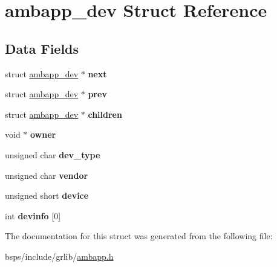 \hypertarget{structambapp__dev}{}\section{ambapp\+\_\+dev Struct Reference}
\label{structambapp__dev}
\subsection*{Data Fields}
\begin{DoxyCompactItemize}
\item 
\mbox{\label{structambapp__dev_a381cf3c88e29b41fd8f0ba7e7933e412}} 
struct \mbox{\hyperlink{structambapp__dev}{ambapp\+\_\+dev}} $\ast$ {\bfseries next}
\item 
\mbox{\label{structambapp__dev_ad15e4b61830b7d77a242a30af5947dfe}} 
struct \mbox{\hyperlink{structambapp__dev}{ambapp\+\_\+dev}} $\ast$ {\bfseries prev}
\item 
\mbox{\label{structambapp__dev_a83a52ee4fbba518aa3d7bceca3c3b446}} 
struct \mbox{\hyperlink{structambapp__dev}{ambapp\+\_\+dev}} $\ast$ {\bfseries children}
\item 
\mbox{\label{structambapp__dev_acbc2c0b8d1330c83c6d73915c0e8e324}} 
void $\ast$ {\bfseries owner}
\item 
\mbox{\label{structambapp__dev_a15cbf98f9241021b1725a211c4a76bb9}} 
unsigned char {\bfseries dev\+\_\+type}
\item 
\mbox{\label{structambapp__dev_a3f8de636546e46e42c02be360eadc427}} 
unsigned char {\bfseries vendor}
\item 
\mbox{\label{structambapp__dev_a3e07425b465ea85e5c3db875473af590}} 
unsigned short {\bfseries device}
\item 
\mbox{\label{structambapp__dev_ac7cfca81c0328a068829622f32d303cf}} 
int {\bfseries devinfo} \mbox{[}0\mbox{]}
\end{DoxyCompactItemize}


The documentation for this struct was generated from the following file\+:\begin{DoxyCompactItemize}
\item 
bsps/include/grlib/\mbox{\hyperlink{ambapp_8h}{ambapp.\+h}}\end{DoxyCompactItemize}
